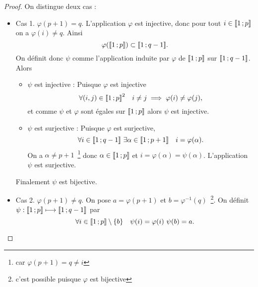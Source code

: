 \begin{proof}
On distingue deux cas :
\begin{itemize}
\item Cas 1. $\varphi(p+1)=q$. L'application $\varphi$ est injective, donc pour tout $i \in \mathopen{\llbracket}1\mathclose{}\mathpunct{};p\mathclose{\rrbracket}$ on a $\varphi(i) \neq q$. Ainsi
  \begin{equation}
    \varphi(\mathopen{\llbracket}1\mathclose{}\mathpunct{};p\mathclose{\rrbracket}) \subset \mathopen{\llbracket}1\mathclose{}\mathpunct{};q-1\mathclose{\rrbracket}.
  \end{equation}
  On définit donc $\psi$ comme l'application induite par $\varphi$ de $\mathopen{\llbracket}1\mathclose{}\mathpunct{};p\mathclose{\rrbracket}$ sur $\mathopen{\llbracket}1\mathclose{}\mathpunct{};q-1\mathclose{\rrbracket}$. Alors
  \begin{itemize}
  \item $\psi$ est injective : Puisque $\varphi$ est injective
    \begin{equation}
      \forall (i, j) \in \mathopen{\llbracket}1\mathclose{}\mathpunct{};p\mathclose{\rrbracket}^2 \quad i \neq j \implies \varphi(i) \neq \varphi(j),
    \end{equation}
    et comme $\psi$ et $\varphi$ sont égales sur $\mathopen{\llbracket}1\mathclose{}\mathpunct{};p\mathclose{\rrbracket}$ alors $\psi$ est injective.
  \item $\psi$ est surjective : Puisque $\varphi$ est surjective,
    \begin{equation}
      \forall i \in \mathopen{\llbracket}1\mathclose{}\mathpunct{};q-1\mathclose{\rrbracket} \ \exists \alpha \in \mathopen{\llbracket}1\mathclose{}\mathpunct{};p+1\mathclose{\rrbracket} \quad i=\varphi(\alpha).
    \end{equation}
    On a $\alpha \neq p+1$~\footnote{car $\varphi(p+1)=q \neq i$} donc $\alpha \in \mathopen{\llbracket}1\mathclose{}\mathpunct{};p\mathclose{\rrbracket}$ et $i= \varphi(\alpha)=\psi(\alpha)$. L'application $\psi$ est surjective.
  \end{itemize}
  Finalement $\psi$ est bijective.
\item Cas 2. $\varphi(p+1) \neq q$. On pose $a=\varphi(p+1)$ et $b=\varphi^{-1}(q)$~\footnote{c'est possible puisque $\varphi$ est bijective}. On définit $    \psi :\mathopen{\llbracket}1\mathclose{}\mathpunct{};p\mathclose{\rrbracket} \longmapsto \mathopen{\llbracket}1\mathclose{}\mathpunct{};q-1\mathclose{\rrbracket}$
  par
  \begin{equation}
    \forall i \in \mathopen{\llbracket}1\mathclose{}\mathpunct{};p\mathclose{\rrbracket} \setminus \{b\} \quad \psi(i)=\varphi(i) \ \psi(b)=a.
  \end{equation}
  

\end{itemize}
\end{proof}

